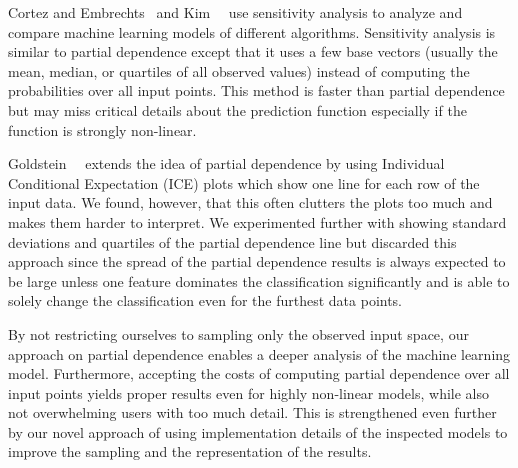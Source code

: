 Cortez and Embrechts~\cite{cortez2011opening,Cortez20131} and Kim~\etal~\cite{kim2014bayesian}
use sensitivity analysis to analyze and compare machine learning models of different algorithms.
Sensitivity analysis is similar to partial dependence except that it uses a few
base vectors (usually the mean, median, or quartiles of all observed values)
instead of computing the probabilities over all input points.
This method is faster than partial dependence but may miss critical details
about the prediction function especially if the function is strongly non-linear.

Goldstein~\etal~\cite{goldstein14} extends the idea of partial dependence by using
Individual Conditional Expectation (ICE) plots which show one line for each row of the input data.
We found, however, that this often clutters the plots too much and makes them harder to interpret.
We experimented further with showing standard deviations and quartiles of the partial dependence line
but discarded this approach since the spread of the partial dependence results is always expected to
be large unless one feature dominates the classification significantly and is able to solely change
the classification even for the furthest data points.

By not restricting ourselves to sampling only the observed input space, our approach on partial dependence
enables a deeper analysis of the machine learning model. Furthermore, accepting the costs of computing
partial dependence over all input points yields proper results even for highly non-linear models,
while also not overwhelming users with too much detail.
This is strengthened even further by our novel approach of using implementation details of the inspected
models to improve the sampling and the representation of the results.
